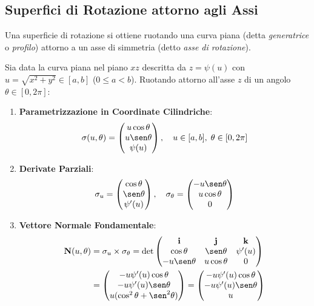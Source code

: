 \subsection{Superfici di Rotazione attorno agli Assi}

Una superficie di rotazione si ottiene ruotando una curva piana (detta \textit{generatrice} o \textit{profilo}) attorno a un asse di simmetria (detto \textit{asse di rotazione}).

\begin{metodo}
Sia data la curva piana nel piano $xz$ descritta da $z = \psi(u)$ con $u = \sqrt{x^2+y^2} \in [a,b]$ ($0 \le a < b$). Ruotando attorno all'asse $z$ di un angolo $\theta \in [0, 2\pi]$:
\begin{enumerate}
    \item \textbf{Parametrizzazione in Coordinate Cilindriche}:
    \[
    \sigma(u, \theta) = \begin{pmatrix} u \cos\theta \\ u \sen\theta \\ \psi(u) \end{pmatrix}, \quad u \in [a,b], \; \theta \in [0, 2\pi]
    \]
    \item \textbf{Derivate Parziali}:
    \[
    \sigma_u = \begin{pmatrix} \cos\theta \\ \sen\theta \\ \psi'(u) \end{pmatrix}, \quad \sigma_\theta = \begin{pmatrix} -u \sen\theta \\ u \cos\theta \\ 0 \end{pmatrix}
    \]
    \item \textbf{Vettore Normale Fondamentale}:
    \begin{align*}
    \mathbf{N}(u,\theta) &= \sigma_u \times \sigma_\theta = \det \begin{pmatrix} \mathbf{i} & \mathbf{j} & \mathbf{k} \\ \cos\theta & \sen\theta & \psi'(u) \\ -u\sen\theta & u\cos\theta & 0 \end{pmatrix} \\
    &= \begin{pmatrix} -u \psi'(u) \cos\theta \\ -u \psi'(u) \sen\theta \\ u (\cos^2\theta + \sen^2\theta) \end{pmatrix} = \begin{pmatrix} -u \psi'(u) \cos\theta \\ -u \psi'(u) \sen\theta \\ u \end{pmatrix}

\end{align*}
\end{enumerate}
\end{metodo}
